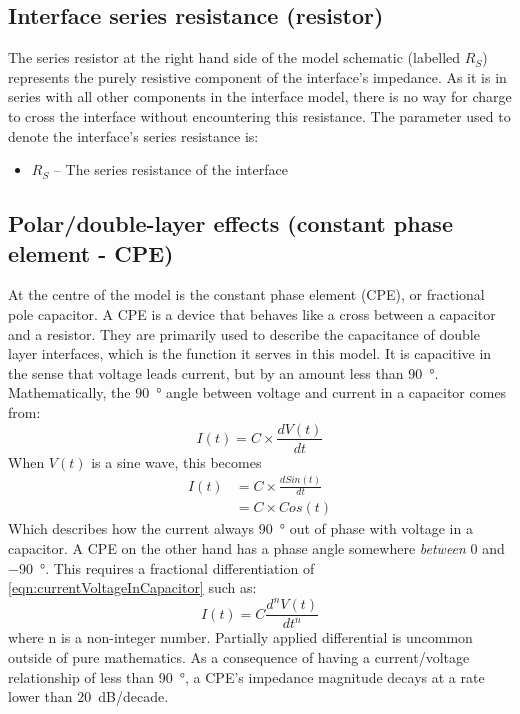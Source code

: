   \subsection{Interface series resistance (resistor)}


    The series resistor at the right hand side of the model schematic (labelled $R_{S}$) represents the purely resistive component of the interface's impedance.
    As it is in series with all other components in the interface model, there is no way for charge to cross the interface without encountering this resistance.
    The parameter used to denote the interface's series resistance is:
    \begin{itemize}
      \item $R_S$ -- The series resistance of the interface
    \end{itemize}

  \subsection{Polar/double-layer effects (constant phase element - CPE)}

    At the centre of the model is the constant phase element (CPE), or fractional pole capacitor.
    A CPE is a device that behaves like a cross between a capacitor and a resistor.
    They are primarily used to describe the capacitance of double layer interfaces, which is the function it serves in this model.
    It is capacitive in the sense that voltage leads current, but by an amount less than \SI{90}{\degree}.
    Mathematically, the \SI{90}{\degree} angle between voltage and current in a capacitor comes from:
    \begin{equation}
    I(t) = C \times \frac{dV(t)}{dt}
    \label{eqn:currentVoltageInCapacitor}
    \end{equation}
    When $V(t)$ is a sine wave, this becomes
    \begin{align}
      I(t) &= C \times \frac{d Sin(t)}{dt}\\
           &= C \times Cos(t)
    \end{align}
    Which describes how the current always \SI{90}{\degree} out of phase with voltage in a capacitor.
    A CPE on the other hand has a phase angle somewhere \emph{between} 0 and \SI{-90}{\degree}.
    This requires a fractional differentiation of \cref{eqn:currentVoltageInCapacitor} such as:
    \begin{equation}
      I(t) = C \frac{d^n V(t)}{dt^n}
    \end{equation}
    where n is a non-integer number.
    Partially applied differential is uncommon outside of pure mathematics.
    As a consequence of having a current/voltage relationship of less than \SI{90}{\degree}, a CPE's impedance magnitude decays at a rate lower than 20\ dB/decade.

